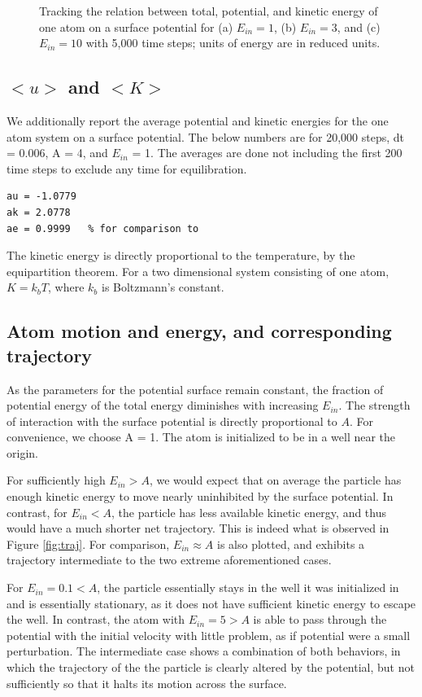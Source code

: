 \documentclass[12pt, oneside]{article}
\begin{document}
\begin{figure}
\begin{minipage}[!htbp]{.5\linewidth}
\subcaption{}
\end{minipage}
\caption{Tracking the relation between total, potential, and kinetic energy of one atom on a surface potential for (a) $E_{in} = 1$, (b) $E_{in} = 3$, and (c) $E_{in} = 10$ with 5,000 time steps; units of energy are in reduced units.}
\label{fig:varye}
\end{figure}

\subsection{$<u>$ and $<K>$}

We additionally report the average potential and kinetic energies for the one atom system on a surface potential. The below numbers are for 20,000 steps, dt = 0.006, A = 4, and $E_{in}$ = 1. The averages are done not including the first 200 time steps to exclude any time for equilibration.   

\begin{verbatim}
au = -1.0779
ak = 2.0778
ae = 0.9999   % for comparison to
\end{verbatim}

The kinetic energy is directly proportional to the temperature, by the equipartition theorem. For a two dimensional system consisting of one atom, $K = k_b T$, where $k_b$ is Boltzmann's constant.

\subsection{Atom motion and energy, and corresponding trajectory}

As the parameters for the potential surface remain constant, the fraction of potential energy of the total energy diminishes with increasing $E_{in}$. The strength of interaction with the surface potential is directly proportional to $A$. For convenience, we choose A = 1. The atom is initialized to be in a well near the origin.

For sufficiently high $E_{in} > A$, we would expect that on average the particle has enough kinetic energy to move nearly uninhibited by the surface potential. In contrast, for $E_{in} < A$, the particle has less available kinetic energy, and thus would have a much shorter net trajectory. This is indeed what is observed in Figure \ref{fig:traj}. For comparison, $E_{in} \approx A$ is also plotted, and exhibits a trajectory intermediate to the two extreme aforementioned cases. 

For $E_{in} = 0.1 < A $, the particle essentially stays in the well it was initialized in and is essentially stationary, as it does not have sufficient kinetic energy to escape the well. In contrast, the atom with $E_{in} = 5 > A$ is able to pass through the potential with the initial velocity with little problem, as if potential were a small perturbation. The intermediate case shows a combination of both behaviors, in which the trajectory of the the particle is clearly altered by the potential, but not sufficiently so that it halts its motion across the surface.
\end{document}
